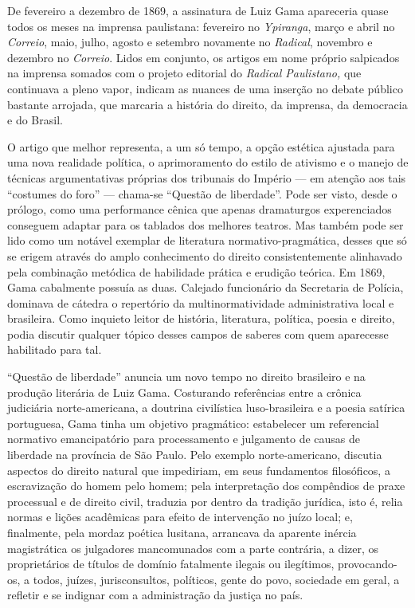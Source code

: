 De fevereiro a dezembro de 1869, a assinatura de Luiz Gama apareceria
quase todos os meses na imprensa paulistana: fevereiro no \emph{Ypiranga}, 
março e abril no \emph{Correio}, maio, julho, agosto e
setembro novamente no \emph{Radical}, novembro e dezembro no
\emph{Correio}. Lidos em conjunto, os artigos em nome próprio salpicados
na imprensa somados com o projeto editorial do \emph{Radical
Paulistano,} que continuava a pleno vapor, indicam as nuances de uma
inserção no debate público bastante arrojada, que marcaria a história do
direito, da imprensa, da democracia e do Brasil.

O artigo que melhor representa, a um só tempo, a opção estética ajustada
para uma nova realidade política, o aprimoramento do estilo de ativismo
e o manejo de técnicas argumentativas próprias dos tribunais do Império
--- em atenção aos tais ``costumes do foro'' --- chama-se ``Questão de
liberdade''. Pode ser visto, desde o prólogo, como uma performance cênica
que apenas dramaturgos experenciados conseguem adaptar para os tablados
dos melhores teatros. Mas também pode ser lido como um notável exemplar
de literatura normativo-pragmática, desses que só se erigem através do
amplo conhecimento do direito consistentemente alinhavado pela
combinação metódica de habilidade prática e erudição teórica. Em 1869,
Gama cabalmente possuía as duas. Calejado funcionário da Secretaria de
Polícia, dominava de cátedra o repertório da multinormatividade
administrativa local e brasileira. Como inquieto leitor de história,
literatura, política, poesia e direito, podia discutir qualquer tópico
desses campos de saberes com quem aparecesse habilitado para tal.

``Questão de liberdade'' anuncia um novo tempo no direito brasileiro
e na produção literária de Luiz Gama. Costurando referências entre a
crônica judiciária norte-americana, a doutrina civilística
luso-brasileira e a poesia satírica portuguesa, Gama tinha um objetivo
pragmático: estabelecer um referencial normativo emancipatório para
processamento e julgamento de causas de liberdade na província de São
Paulo. Pelo exemplo norte-americano, discutia aspectos do direito
natural que impediriam, em seus fundamentos filosóficos, a escravização
do homem pelo homem; pela interpretação dos compêndios de praxe
processual e de direito civil, traduzia por dentro da tradição jurídica,
isto é, relia normas e lições acadêmicas para efeito de intervenção no
juízo local; e, finalmente, pela mordaz poética lusitana, arrancava da
aparente inércia magistrática os julgadores mancomunados com a parte
contrária, a dizer, os proprietários de títulos de domínio fatalmente
ilegais ou ilegítimos, provocando-os, a todos, juízes, jurisconsultos,
políticos, gente do povo, sociedade em geral, a refletir e se indignar
com a administração da justiça no país.

